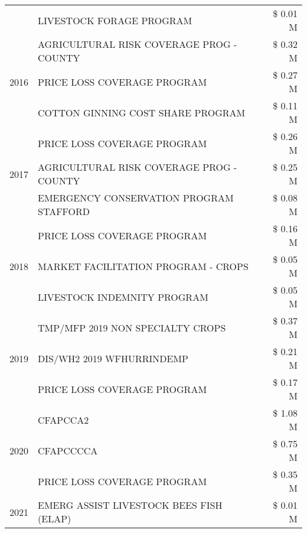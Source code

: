 \begin{tabular}{llr}
 & LIVESTOCK FORAGE PROGRAM & \$ 0.01 M \\
\cline{1-3}
\multirow[t]{3}{*}{2016} & AGRICULTURAL RISK COVERAGE PROG - COUNTY & \$ 0.32 M \\
 & PRICE LOSS COVERAGE PROGRAM & \$ 0.27 M \\
 & COTTON GINNING COST SHARE PROGRAM & \$ 0.11 M \\
\cline{1-3}
\multirow[t]{3}{*}{2017} & PRICE LOSS COVERAGE PROGRAM & \$ 0.26 M \\
 & AGRICULTURAL RISK COVERAGE PROG - COUNTY & \$ 0.25 M \\
 & EMERGENCY CONSERVATION PROGRAM STAFFORD & \$ 0.08 M \\
\cline{1-3}
\multirow[t]{3}{*}{2018} & PRICE LOSS COVERAGE PROGRAM & \$ 0.16 M \\
 & MARKET FACILITATION PROGRAM - CROPS & \$ 0.05 M \\
 & LIVESTOCK INDEMNITY PROGRAM & \$ 0.05 M \\
\cline{1-3}
\multirow[t]{3}{*}{2019} & TMP/MFP 2019 NON SPECIALTY CROPS & \$ 0.37 M \\
 & DIS/WH2 2019 WFHURRINDEMP & \$ 0.21 M \\
 & PRICE LOSS COVERAGE PROGRAM & \$ 0.17 M \\
\cline{1-3}
\multirow[t]{3}{*}{2020} & CFAPCCA2 & \$ 1.08 M \\
 & CFAPCCCCA & \$ 0.75 M \\
 & PRICE LOSS COVERAGE PROGRAM & \$ 0.35 M \\
\cline{1-3}
2021 & EMERG ASSIST LIVESTOCK BEES FISH (ELAP) & \$ 0.01 M \\
\cline{1-3}
\bottomrule
\end{tabular}
